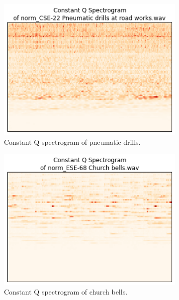 \documentclass{sig-alternate-05-2015}
\begin{document}
\begin{figure}[hbt!]
        \begin{subfigure}[b]{0.45\textwidth}
      \centering
      \includegraphics[width=\textwidth]{figures/cqt_pneumatic_drills.png}
      \caption{Constant Q spectrogram of pneumatic drills.}
      \label{fig:cqt-applause}
    \end{subfigure}
    \hfill 
    \begin{subfigure}[b]{0.45\textwidth}
      \centering
      \includegraphics[width=\textwidth]{figures/cqtChurchBells.png}
      \caption{Constant Q spectrogram of church bells.}
      \label{fig:cqt-applause}
    \end{subfigure}
    \\
    \begin{subfigure}[b]{0.45\textwidth}

\end{subfigure}
\end{figure}
\end{document}
